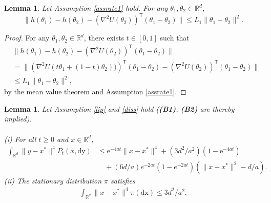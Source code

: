 \documentclass[a4paper]{article}
\newtheorem{lemma}[theorem]{Lemma}
\def\e{\text{e}}
\def\Rd{\mathbb{R}^{d}}
\begin{document}
\begin{lemma}\label{mvt}
	Let Assumption \ref{assrate1} hold. For any $\theta_1, \theta_2 \in \mathbb{R}^{d}$,
	\[
	\|h(\theta_1) - h(\theta_2) - \left(\nabla^2 U (\theta_2)\right)^{\mathsf{T}}(\theta_1- \theta_2)\| \leq L_1 \|\theta_1-\theta_2\|^2.
	\]
\end{lemma}
\begin{proof}
For any $\theta_1, \theta_2 \in \mathbb{R}^{d}$, there exists $t \in [0,1]$ such that
	\begin{align*}
	 &\|h(\theta_1) - h(\theta_2) - \left(\nabla^2 U (\theta_2)\right)^{\mathsf{T}}(\theta_1- \theta_2)\|\\
	 & = \| \left(\nabla^2 U (t\theta_1+(1-t)\theta_2))\right)^{\mathsf{T}}(\theta_1- \theta_2) - \left(\nabla^2 U (\theta_2)\right)^{\mathsf{T}}(\theta_1- \theta_2)\|\\
     & \leq  L_1 \|\theta_1-\theta_2\|^2,
\end{align*}
by the mean value theorem and Assumption \ref{assrate1}. 
\end{proof}
\begin{lemma}\label{lemmaforrate1}
	Let Assumption \ref{lip} and \ref{diss} hold ({\bf (B1)}, {\bf (B2)} are thereby implied).
	\\
	\\
	(i) For all $t\geq 0$ and $x \in \Rd$,
	\begin{align*}
	\int_{\Rd}\|y-x^*\|^4 P_t(x,\mathrm{dy}) &\leq \e^{-4at}\|x-x^*\|^4+(3d^2/a^2)\left(1 -\e^{-4at}\right)\\
	& \hspace{1em} +(6d/a)e^{-2at}(1-e^{-2at})(\|x-x^*\|^2-d/a).
	\end{align*}
	(ii) The stationary distribution $\pi$ satisfies
	\begin{align*}
	\int_{\Rd}\|x-x^*\|^4\pi(\mathrm{dx}) \leq 3d^2/a^2.
	\end{align*}
\end{lemma}
\end{document}
